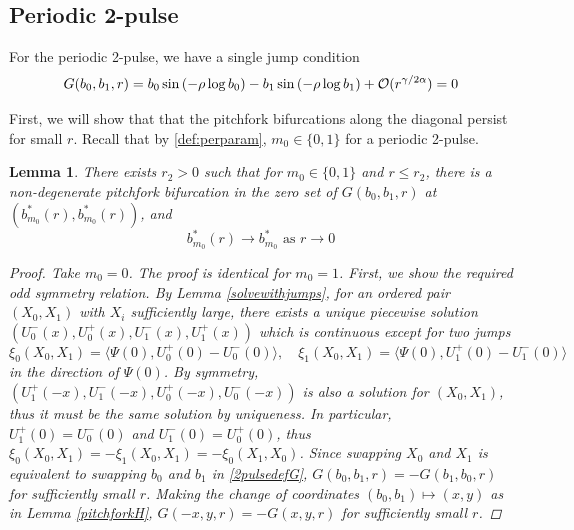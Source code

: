\documentclass[10pt,reqno]{amsart}
\theoremstyle{plain}
\newtheorem{lemma}[theorem]{Lemma}
\theoremstyle{definition}
\theoremstyle{remark}
\numberwithin{theorem}{section}
\numberwithin{equation}{section}
\begin{document}
\subsection{Periodic 2-pulse}

For the periodic 2-pulse, we have a single jump condition
\begin{equation}\label{2pulsedefG}
G(b_0, b_1, r) = b_0 \sin \left( -\rho \log b_0 \right) - b_1 \sin \left( -\rho \log b_1 \right) + \mathcal{O}(r^{\gamma / 2 \alpha}) = 0 \\
\end{equation}

First, we will show that that the pitchfork bifurcations along the diagonal persist for small $r$. Recall that by \cref{def:perparam}, $m_0 \in \{0, 1\}$ for a periodic 2-pulse.

\begin{lemma}\label{pitchpersist}
There exists $r_2 > 0$ such that for $m_0 \in \{0, 1\}$ and $r \leq r_2$, there is a non-degenerate pitchfork bifurcation in the zero set of $G(b_0, b_1, r)$ at $(b_{m_0}^*(r),b_{m_0}^*(r))$, and 
\begin{equation*}
b_{m_0}^*(r) \rightarrow b_{m_0}^* \text{ as } r \rightarrow 0
\end{equation*}
\begin{proof}
Take $m_0 = 0$. The proof is identical for $m_0 = 1$. First, we show the required odd symmetry relation. By Lemma \ref{solvewithjumps}, for an ordered pair $(X_0, X_1)$ with $X_i$ sufficiently large, there exists a unique piecewise solution $(U_0^-(x), U_0^+(x), U_1^-(x), U_1^+(x))$ which is continuous except for two jumps 
\begin{equation}\label{xijumps}
\xi_0(X_0, X_1) = \langle \Psi(0), U_0^+(0) - U_0^-(0) \rangle, \quad
\xi_1(X_0, X_1) = \langle \Psi(0), U_1^+(0) - U_1^-(0) \rangle 
\end{equation}
in the direction of $\Psi(0)$. By symmetry, $(U_1^+(-x), U_1^-(-x), U_0^+(-x), U_0^-(-x))$ is also a solution for $(X_0, X_1)$, thus it must be the same solution by uniqueness. In particular, $U_1^+(0) = U_0^-(0)$ and $U_1^-(0) = U_0^+(0)$, thus $\xi_0(X_0, X_1) = -\xi_1(X_0, X_1) = -\xi_0(X_1, X_0)$. Since swapping $X_0$ and $X_1$ is equivalent to swapping $b_0$ and $b_1$ in \cref{2pulsedefG}, $G(b_0, b_1, r) = -G(b_1, b_0, r)$ for sufficiently small $r$. Making the change of coordinates $(b_0, b_1) \mapsto (x, y)$ as in Lemma \ref{pitchforkH}, $G(-x, y, r) = -G(x, y, r)$ for sufficiently small $r$. 


\end{proof}
\end{lemma}
\end{document}
